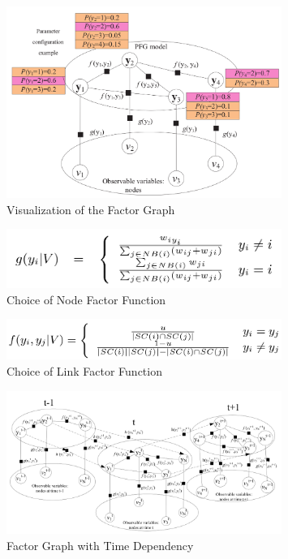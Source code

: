 \documentclass[11pt,a4paper]{article}
\begin{document}
\begin{figure}[htb]
\centering
	\includegraphics[width=0.8\textwidth]{fig/wang2011-FG-vis.png}
	\caption{Visualization of the Factor Graph}
\end{figure}

\begin{figure}[htb]
\centering
	\includegraphics[width=0.8\textwidth]{fig/wang2011-nodefactor.png}
	\caption{Choice of Node Factor Function}
\end{figure}

\begin{figure}[htb]
\centering
	\includegraphics[width=0.8\textwidth]{fig/wang2011-edgefactor.png}
	\caption{Choice of Link Factor Function}
\end{figure}

\begin{figure}[htb]
\centering
	\includegraphics[width=0.8\textwidth]{fig/wang2011-FG-dynamic.png}
	\caption{Factor Graph with Time Dependency}
\end{figure}
\end{document}
